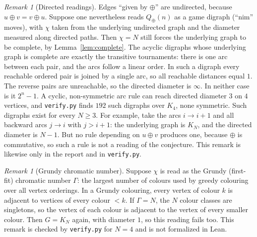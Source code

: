 \documentclass[11pt]{article}
\theoremstyle{definition}
\theoremstyle{remark}
\newtheorem{remark}[theorem]{Remark}
\begin{document}
\begin{remark}[Directed readings]\label{rem:directed}
Edges ``given by $\oplus$'' are undirected, because $u\oplus v=v\oplus u$.
Suppose one nevertheless reads $Q_\oplus(n)$ as a game digraph (``nim'' moves),
with $\chi$ taken from the underlying undirected graph and the diameter
measured along directed paths. Then $\chi=N$ still forces the underlying graph
to be complete, by Lemma~\ref{lem:complete}. The acyclic digraphs whose
underlying graph is complete are exactly the transitive tournaments: there is
one arc between each pair, and the arcs follow a linear order. In such a
digraph every reachable ordered pair is joined by a single arc, so all
reachable distances equal $1$. The reverse pairs are unreachable, so the
directed diameter is $\infty$. In neither case is it $2^n-1$. A cyclic,
non-symmetric arc rule can reach directed diameter $3$ on $4$ vertices, and
\texttt{verify.py} finds $192$ such digraphs over $K_4$, none symmetric. Such
digraphs exist for every $N\ge3$. For example, take the arcs $i\to i+1$ and
all backward arcs $j\to i$ with $j>i+1$: the underlying graph is $K_N$, and the
directed diameter is $N-1$. But no rule depending on $u\oplus v$ produces one,
because $\oplus$ is commutative, so such a rule is not a reading of the
conjecture. This remark is likewise only in the report and
in \texttt{verify.py}.
\end{remark}

\begin{remark}[Grundy chromatic number]\label{rem:grundy}
Suppose $\chi$ is read as the Grundy (first-fit) chromatic number $\Gamma$: the
largest number of colours used by greedy colouring over all vertex orderings.
In a Grundy colouring, every vertex of colour $k$ is adjacent to vertices of
every colour $<k$. If $\Gamma=N$, the $N$ colour classes are singletons, so the
vertex of each colour is adjacent to the vertex of every smaller colour. Then
$G=K_N$ again, with diameter $1$, so this reading fails too. This remark is
checked by \texttt{verify.py} for $N=4$ and is not formalized in Lean.
\end{remark}
\end{document}
